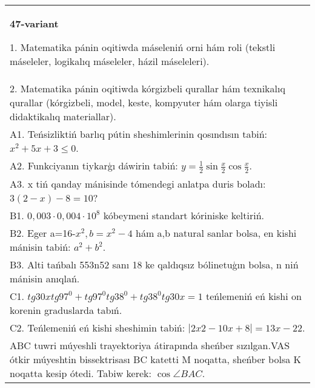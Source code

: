 \documentclass{article}
\begin{document}
\begin{tabular}{m{17cm}}
\textbf{47-variant}

1. Matematika pánin oqitiwda máseleniń orni hám roli (tekstli máseleler, logikalıq máseleler, házil máseleleri). \\
2. Matematika pánin oqitiwda kórgizbeli qurallar hám texnikalıq qurallar (kórgizbeli, model, keste, kompyuter hám olarga tiyisli didaktikalıq materiallar). \\
A1. Teńsizliktiń barlıq pútin sheshimlerinin qosındısın tabiń: \(x^2 + 5x + 3 \leq 0\). \\
A2. Funkciyanın tiykarģı dáwirin tabiń: \(y = \frac{1}{2}\sin{\frac{x}{2}\cos\frac{x}{2}}\). \\
A3. x tiń qanday mánisinde tómendegi anlatpa duris boladı: \(3 (2 - x) - 8 = 10\)? \\
B1. \(0,003 \cdot 0,004 \cdot 10^{8}\) kóbeymeni standart kóriniske keltiriń. \\
B2. Eger a=16-\(x^2, b=x^2 - 4\) hám a,b natural sanlar bolsa, en kishi mánisin tabiń: \(a^2 + b^2\). \\
B3. Alti tańbalı 553n52 sanı 18 ke qaldıqsız bólinetuģın bolsa, n niń mánisin anıqlań. \\
C1. \(tg30xtg97^{0} + tg97^{0}tg38^{0} + tg38^{0}tg30x = 1\) teńlemeniń eń kishi on korenin graduslarda tabıń. \\
C2. Teńlemeniń eń kishi sheshimin tabiń: \(\left| 2x2 - 10x + 8 \right| = 13x - 22\). \\
ABC tuwri múyeshli trayektoriya átirapında sheńber sızılgan.VAS ótkir múyeshtin bissektrisası BC katetti M noqatta, sheńber bolsa K noqatta kesip ótedi. Tabiw kerek: \(\cos\angle BAC\). \\

\end{tabular}
\vspace{1cm}
\end{document}
